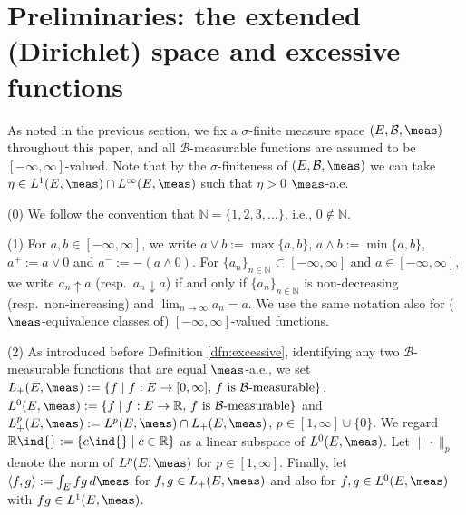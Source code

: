 \section{Preliminaries: the extended (Dirichlet) space and excessive functions}\label{sec:preliminaries}
As noted in the previous section, we fix a $\sigma$-finite measure space
$(E,\mathcal{B},\meas)$ throughout this paper, and all
$\mathcal{B}$-measurable functions are assumed to be $[-\infty,\infty]$-valued.
Note that by the $\sigma$-finiteness of $(E,\mathcal{B},\meas)$ we can take
$\eta\in L^{1}(E,\meas)\cap L^{\infty}(E,\meas)$ such that $\eta>0$ $\meas$-a.e.
%
\begin{ntn}
\textup{(0)} We follow the convention that $\mathbb{N}=\{1,2,3,\dots\}$,
i.e., $0\not\in\mathbb{N}$.

\noindent
\textup{(1)} For $a,b\in[-\infty,\infty]$, we write $a\vee b:=\max\{a,b\}$,
$a\wedge b:=\min\{a,b\}$, $a^{+}:=a\vee 0$ and
$a^{-}:=-(a\wedge 0)$. For $\{a_{n}\}_{n\in\mathbb{N}}\subset[-\infty,\infty]$
and $a\in[-\infty,\infty]$,
we write $a_{n}\uparrow a$ (resp.\ $a_{n}\downarrow a$) if and only if
$\{a_{n}\}_{n\in\mathbb{N}}$ is non-decreasing (resp.\ non-increasing) and
$\lim_{n\to\infty}a_{n}=a$. We use the same notation
also for ($\meas$-equivalence classes of) $[-\infty,\infty]$-valued functions.

\noindent
\textup{(2)} As introduced before Definition \ref{dfn:excessive},
identifying any two $\mathcal{B}$-measurable functions that are equal $\meas$-a.e., we set
$L_{+}(E,\meas):=\{f\mid f:E\to[0,\infty],\,f\textrm{ is }\mathcal{B}\textrm{-measurable}\}$,
$L^{0}(E,\meas):=\{f\mid f:E\to\mathbb{R},\,f\textrm{ is }\mathcal{B}\textrm{-measurable}\}$
and $L^{p}_{+}(E,\meas):=L^{p}(E,\meas)\cap L_{+}(E,\meas)$, $p\in[1,\infty]\cup\{0\}$.
We regard $\mathbb{R}\ind{}:=\{c\ind{}\mid c\in\mathbb{R}\}$ as
a linear subspace of $L^{0}(E,\meas)$.
Let $\|\cdot\|_{p}$ denote the norm of $L^{p}(E,\meas)$ for $p\in[1,\infty]$.
Finally, let $\langle f,g\rangle:=\int_{E}fg\,d\meas$ for
$f,g\in L_{+}(E,\meas)$ and also for
$f,g\in L^{0}(E,\meas)$ with $fg\in L^{1}(E,\meas)$.
\end{ntn}
%

